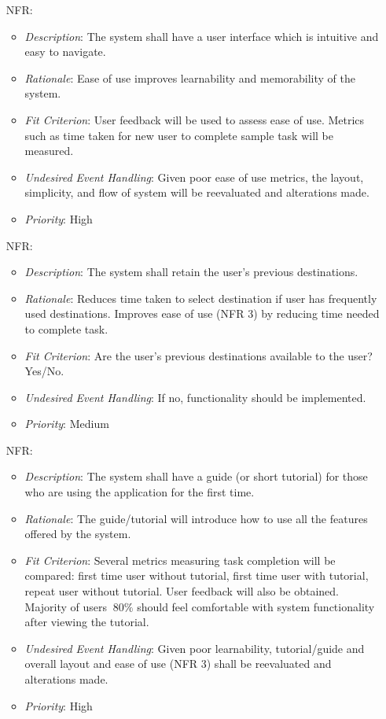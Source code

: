 \documentclass[12pt]{article}
\newcounter{nfrnum} %
\begin{document}
\begin{itemize}
\item[NFR\refstepcounter{nfrnum}\thenfrnum \label{NFR_3}:] 
\begin{itemize}
  \item \textit{Description}: The system shall have a user interface which is intuitive and easy to navigate. 
  \item \textit{Rationale}: Ease of use improves learnability and memorability of the system.
  \item \textit{Fit Criterion}: User feedback will be used to assess ease of use. Metrics such as time taken for new user to complete sample task will be measured.
  \item \textit{Undesired Event Handling}: Given poor ease of use metrics, the layout, simplicity, and flow of system will be reevaluated and alterations made. 
  \item \textit{Priority}: High
\end{itemize}

\item[NFR\refstepcounter{nfrnum}\thenfrnum \label{NFR_4}:] 
\begin{itemize}
  \item \textit{Description}: The system shall retain the user’s previous destinations. 
  \item \textit{Rationale}: Reduces time taken to select destination if user has frequently used destinations. Improves ease of use (NFR 3) by reducing time needed to complete task. 
  \item \textit{Fit Criterion}: Are the user’s previous destinations available to the user? Yes/No.  
  \item \textit{Undesired Event Handling}: If no, functionality should be implemented.
  \item \textit{Priority}: Medium
\end{itemize}

\item[NFR\refstepcounter{nfrnum}\thenfrnum \label{NFR_5}:] 
\begin{itemize}
  \item \textit{Description}: The system shall have a guide (or short tutorial) for those who are using the application for the first time. 
  \item \textit{Rationale}: The guide/tutorial will introduce how to use all the features offered by the system.
  \item \textit{Fit Criterion}: Several metrics measuring task completion will be compared: first time user without tutorial, first time user with tutorial, repeat user without tutorial. User feedback will also be obtained. Majority of users \(\>80\%\) should feel comfortable with system functionality after viewing the tutorial.  
  \item \textit{Undesired Event Handling}: Given poor learnability, tutorial/guide and overall layout and ease of use (NFR 3) shall be reevaluated and alterations made.
  \item \textit{Priority}: High
\end{itemize}


\end{itemize}
\end{document}
